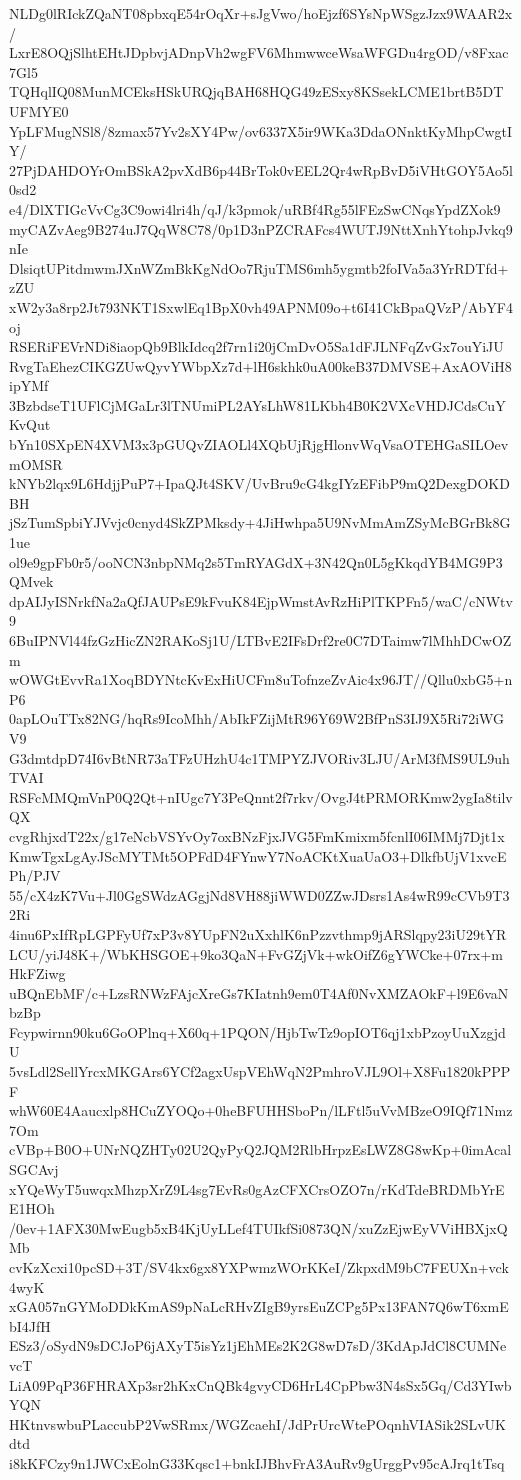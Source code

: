 NLDg0lRIckZQaNT08pbxqE54rOqXr+sJgVwo/hoEjzf6SYsNpWSgzJzx9WAAR2x/
LxrE8OQjSlhtEHtJDpbvjADnpVh2wgFV6MhmwwceWsaWFGDu4rgOD/v8Fxac7Gl5
TQHqlIQ08MunMCEksHSkURQjqBAH68HQG49zESxy8KSsekLCME1brtB5DTUFMYE0
YpLFMugNSl8/8zmax57Yv2sXY4Pw/ov6337X5ir9WKa3DdaONnktKyMhpCwgtIY/
27PjDAHDOYrOmBSkA2pvXdB6p44BrTok0vEEL2Qr4wRpBvD5iVHtGOY5Ao5l0sd2
e4/DlXTIGcVvCg3C9owi4lri4h/qJ/k3pmok/uRBf4Rg55lFEzSwCNqsYpdZXok9
myCAZvAeg9B274uJ7QqW8C78/0p1D3nPZCRAFcs4WUTJ9NttXnhYtohpJvkq9nIe
DlsiqtUPitdmwmJXnWZmBkKgNdOo7RjuTMS6mh5ygmtb2foIVa5a3YrRDTfd+zZU
xW2y3a8rp2Jt793NKT1SxwlEq1BpX0vh49APNM09o+t6I41CkBpaQVzP/AbYF4oj
RSERiFEVrNDi8iaopQb9BlkIdcq2f7rn1i20jCmDvO5Sa1dFJLNFqZvGx7ouYiJU
RvgTaEhezCIKGZUwQyvYWbpXz7d+lH6skhk0uA00keB37DMVSE+AxAOViH8ipYMf
3BzbdseT1UFlCjMGaLr3lTNUmiPL2AYsLhW81LKbh4B0K2VXcVHDJCdsCuYKvQut
bYn10SXpEN4XVM3x3pGUQvZIAOLl4XQbUjRjgHlonvWqVsaOTEHGaSILOevmOMSR
kNYb2lqx9L6HdjjPuP7+IpaQJt4SKV/UvBru9cG4kgIYzEFibP9mQ2DexgDOKDBH
jSzTumSpbiYJVvjc0cnyd4SkZPMksdy+4JiHwhpa5U9NvMmAmZSyMcBGrBk8G1ue
ol9e9gpFb0r5/ooNCN3nbpNMq2s5TmRYAGdX+3N42Qn0L5gKkqdYB4MG9P3QMvek
dpAIJyISNrkfNa2aQfJAUPsE9kFvuK84EjpWmstAvRzHiPlTKPFn5/waC/cNWtv9
6BuIPNVl44fzGzHicZN2RAKoSj1U/LTBvE2IFsDrf2re0C7DTaimw7lMhhDCwOZm
wOWGtEvvRa1XoqBDYNtcKvExHiUCFm8uTofnzeZvAic4x96JT//Qllu0xbG5+nP6
0apLOuTTx82NG/hqRs9IcoMhh/AbIkFZijMtR96Y69W2BfPnS3IJ9X5Ri72iWGV9
G3dmtdpD74I6vBtNR73aTFzUHzhU4c1TMPYZJVORiv3LJU/ArM3fMS9UL9uhTVAI
RSFcMMQmVnP0Q2Qt+nIUgc7Y3PeQnnt2f7rkv/OvgJ4tPRMORKmw2ygIa8tilvQX
cvgRhjxdT22x/g17eNcbVSYvOy7oxBNzFjxJVG5FmKmixm5fcnlI06IMMj7Djt1x
KmwTgxLgAyJScMYTMt5OPFdD4FYnwY7NoACKtXuaUaO3+DlkfbUjV1xvcEPh/PJV
55/cX4zK7Vu+Jl0GgSWdzAGgjNd8VH88jiWWD0ZZwJDsrs1As4wR99cCVb9T32Ri
4inu6PxIfRpLGPFyUf7xP3v8YUpFN2uXxhlK6nPzzvthmp9jARSlqpy23iU29tYR
LCU/yiJ48K+/WbKHSGOE+9ko3QaN+FvGZjVk+wkOifZ6gYWCke+07rx+mHkFZiwg
uBQnEbMF/c+LzsRNWzFAjcXreGs7KIatnh9em0T4Af0NvXMZAOkF+l9E6vaNbzBp
Fcypwirnn90ku6GoOPlnq+X60q+1PQON/HjbTwTz9opIOT6qj1xbPzoyUuXzgjdU
5vsLdl2SellYrcxMKGArs6YCf2agxUspVEhWqN2PmhroVJL9Ol+X8Fu1820kPPPF
whW60E4Aaucxlp8HCuZYOQo+0heBFUHHSboPn/lLFtl5uVvMBzeO9IQf71Nmz7Om
cVBp+B0O+UNrNQZHTy02U2QyPyQ2JQM2RlbHrpzEsLWZ8G8wKp+0imAcalSGCAvj
xYQeWyT5uwqxMhzpXrZ9L4sg7EvRs0gAzCFXCrsOZO7n/rKdTdeBRDMbYrEE1HOh
/0ev+1AFX30MwEugb5xB4KjUyLLef4TUIkfSi0873QN/xuZzEjwEyVViHBXjxQMb
cvKzXcxi10pcSD+3T/SV4kx6gx8YXPwmzWOrKKeI/ZkpxdM9bC7FEUXn+vck4wyK
xGA057nGYMoDDkKmAS9pNaLcRHvZIgB9yrsEuZCPg5Px13FAN7Q6wT6xmEbI4JfH
ESz3/oSydN9sDCJoP6jAXyT5isYz1jEhMEs2K2G8wD7sD/3KdApJdCl8CUMNevcT
LiA09PqP36FHRAXp3sr2hKxCnQBk4gvyCD6HrL4CpPbw3N4sSx5Gq/Cd3YIwbYQN
HKtnvswbuPLaccubP2VwSRmx/WGZcaehI/JdPrUrcWtePOqnhVIASik2SLvUKdtd
i8kKFCzy9n1JWCxEolnG33Kqsc1+bnkIJBhvFrA3AuRv9gUrggPv95cAJrq1tTsq
